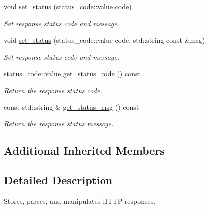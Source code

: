 \begin{DoxyCompactItemize}
void \mbox{\hyperlink{classwebsocketpp_1_1http_1_1parser_1_1response_a2576fc301cc6798d5a830298188b4832}{set\+\_\+status}} (status\+\_\+code\+::value code)
\begin{DoxyCompactList}\small\item\em Set response status code and message. \end{DoxyCompactList}\item 
void \mbox{\hyperlink{classwebsocketpp_1_1http_1_1parser_1_1response_ab673f0371af7934e8abb6946a2952f57}{set\+\_\+status}} (status\+\_\+code\+::value code, std\+::string const \&msg)
\begin{DoxyCompactList}\small\item\em Set response status code and message. \end{DoxyCompactList}\item 
\mbox{\label{classwebsocketpp_1_1http_1_1parser_1_1response_ae604a1d8f8c26d7e71c42c9373deeec5}} 
status\+\_\+code\+::value \mbox{\hyperlink{classwebsocketpp_1_1http_1_1parser_1_1response_ae604a1d8f8c26d7e71c42c9373deeec5}{get\+\_\+status\+\_\+code}} () const
\begin{DoxyCompactList}\small\item\em Return the response status code. \end{DoxyCompactList}\item 
\mbox{\label{classwebsocketpp_1_1http_1_1parser_1_1response_a587122c52c13474c3c79835b7c1e8854}} 
const std\+::string \& \mbox{\hyperlink{classwebsocketpp_1_1http_1_1parser_1_1response_a587122c52c13474c3c79835b7c1e8854}{get\+\_\+status\+\_\+msg}} () const
\begin{DoxyCompactList}\small\item\em Return the response status message. \end{DoxyCompactList}\end{DoxyCompactItemize}
\subsection*{Additional Inherited Members}


\subsection{Detailed Description}
Stores, parses, and manipulates H\+T\+TP responses. 

